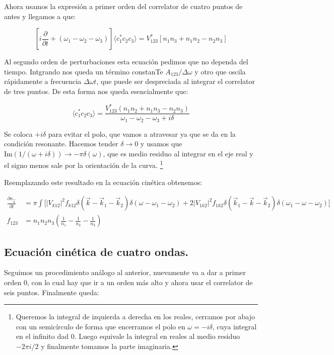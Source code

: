 Ahora usamos la expresión a primer orden del correlator de cuatro puntos de antes y llegamos a que:

\begin{equation}
	\left[i\frac{\partial}{\partial t} + (\omega_1-\omega_2-\omega_3)\right] \langle c_1^*c_2c_3 \rangle = V_{123}^*[n_1n_3+n_1n_2-n_2n_3]
\end{equation}

Al segundo orden de perturbaciones esta ecuación pedimos que no dependa del tiempo. Intgrando nos queda un término constanTe $A_{123}/\Delta\omega$ y otro que oscila rápidamente a frecuencia $\Delta\omega t$, que puede ser despreciada al integrar el correlator de tres puntos. De esta forma nos queda esencialmente que:

\begin{equation}
	\langle c_1^*c_2c_3 \rangle = \frac{V_{123}^*(n_1n_2+n_1n_3-n_2n_3)}{\omega_1-\omega_2-\omega_3+i\delta}
\end{equation} 

Se coloca $+i\delta$ para evitar el polo, que vamos a atravesar ya que se da en la condición resonante. Hacemos tender $\delta\rightarrow0$ y usamos que $\text{Im}(1/(\omega+i\delta))\rightarrow-\pi\delta(\omega)$, que es medio residuo al integrar en el eje real y el signo menos sale por la orientación de la curva. \footnote{Queremos la integral de izquierda a derecha en los reales, cerramos por abajo con un semicírculo de forma que encerramos el polo en $\omega=-i\delta$, cuya integral en el infinito dad 0. Luego equivale la integral en reales al medio residuo $-2\pi i/2$ y finalmente tomamos la parte imaginaria.} 


Reemplazando este resultado en la ecuación cinética obtenemos:

\begin{equation}
	\begin{split}
		\frac{\partial n_{\vec k}}{\partial t} &= \pi \int\big[|V_{k12}|^2f_{k12}\delta(\vec k - \vec k_1 - \vec k_2) \delta(\omega - \omega_1 - \omega_2) + 2 |V_{1k2}|^2 f_{1k2} \delta(\vec k_1 - \vec k - \vec k_2) \delta(\omega_1 - \omega - \omega_2) \big]  \\ 
		f_{123} &= n_1n_2n_3\left(\frac{1}{n_1} - \frac{1}{n_2} -  \frac{1}{n_3}\right)
	\end{split}
\end{equation}


\subsection*{Ecuación cinética de cuatro ondas.}
Seguimos un procedimiento análogo al anterior, nuevamente va a dar a primer orden 0, con lo cual hay que ir a un orden más alto y ahora usar el correlator de seis puntos. Finalmente queda:

